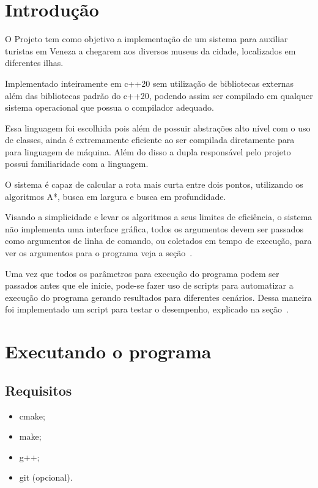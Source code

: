 \documentclass[12pt, a4paper]{article}
\begin{document}
\capa%
\tableofcontents%
\listoffigures\cleardoublepage%

\section{Introdução}\label{sec:intro}
O Projeto tem como objetivo a implementação de um sistema para auxiliar turistas em Veneza a chegarem aos diversos museus da cidade,
localizados em diferentes ilhas.

Implementado inteiramente em c++20 sem utilização de bibliotecas externas além das bibliotecas padrão do c++20,
podendo assim ser compilado em qualquer sistema operacional que possua o compilador adequado.

Essa linguagem foi escolhida pois além de possuir abstrações alto nível com o uso de classes,
ainda é extremamente eficiente ao ser compilada diretamente para para linguagem de máquina.
Além do disso a dupla responsável pelo projeto possui familiaridade com a linguagem.

O sistema é capaz de calcular a rota mais curta entre dois pontos,
utilizando os algoritmos A*, busca em largura e busca em profundidade.

Visando a simplicidade e levar os algoritmos a seus limites de eficiência,
o sistema não implementa uma interface gráfica,
todos os argumentos devem ser passados como argumentos de linha de comando,
ou coletados em tempo de execução, para ver os argumentos para o programa veja a seção~.

Uma vez que todos os parâmetros para execução do programa podem ser passados antes que ele inicie,
pode-se fazer uso de scripts para automatizar a execução do programa gerando resultados para diferentes cenários.
Dessa maneira foi implementado um script para testar o desempenho, explicado na seção~.

\section{Executando o programa}\label{sec:executando_programa}
\subsection{Requisitos}\label{sec:requisitos}
\begin{itemize}
    \item cmake;
    \item make;
    \item g++;
    \item git (opcional).
\end{itemize}
\end{document}
